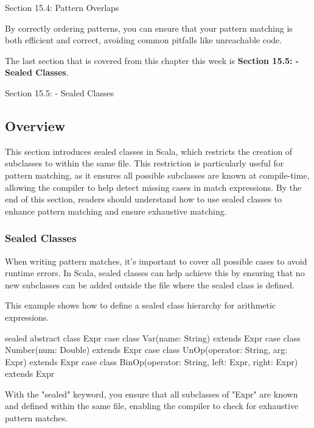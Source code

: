 \begin{notes}{Section 15.4: Pattern Overlaps}
\begin{highlight}
        By correctly ordering patterns, you can ensure that your pattern matching is both efficient and correct, avoiding common pitfalls like unreachable code.
    
    \end{highlight}
\end{notes}

The last section that is covered from this chapter this week is \textbf{Section 15.5: - Sealed Classes}.

\begin{notes}{Section 15.5: - Sealed Classes}
    \subsection*{Overview}

    This section introduces sealed classes in Scala, which restricts the creation of subclasses to within the same file. This restriction is particularly useful for pattern matching, as it ensures 
    all possible subclasses are known at compile-time, allowing the compiler to help detect missing cases in match expressions. By the end of this section, readers should understand how to use 
    sealed classes to enhance pattern matching and ensure exhaustive matching.
    
    \subsubsection*{Sealed Classes}
    
    When writing pattern matches, it's important to cover all possible cases to avoid runtime errors. In Scala, sealed classes can help achieve this by ensuring that no new subclasses can be added 
    outside the file where the sealed class is defined.
    
    \begin{highlight}
    
        This example shows how to define a sealed class hierarchy for arithmetic expressions.
    
    \begin{code}[Scala]
    sealed abstract class Expr
    case class Var(name: String) extends Expr
    case class Number(num: Double) extends Expr
    case class UnOp(operator: String, arg: Expr) extends Expr
    case class BinOp(operator: String, left: Expr, right: Expr) extends Expr
    \end{code}
    
        With the "sealed" keyword, you ensure that all subclasses of "Expr" are known and defined within the same file, enabling the compiler to check for exhaustive pattern matches.
        

\end{highlight}
\end{notes}
